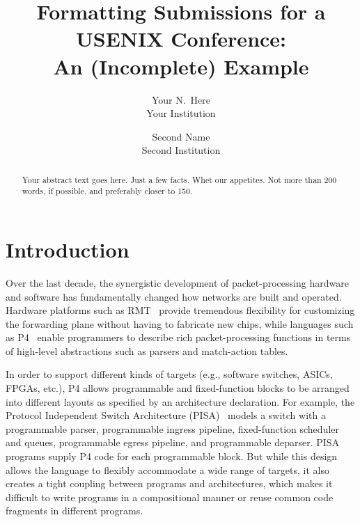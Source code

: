 \date{}

\title{\Large \bf Formatting Submissions for a USENIX Conference:\\
  An (Incomplete) Example}

\author{
{\rm Your N.\ Here}\\
Your Institution
\and
{\rm Second Name}\\
Second Institution
} %

\maketitle

\begin{abstract}
Your abstract text goes here. Just a few facts. Whet our appetites.
Not more than 200 words, if possible, and preferably closer to 150.
\end{abstract}


\section{Introduction}

Over the last decade, the synergistic development of packet-processing
hardware and software has fundamentally changed how networks are built
and operated. Hardware platforms such as
RMT~\cite{Bosshart:2013:FMF:2486001.2486011} provide tremendous
flexibility for customizing the forwarding plane without having to
fabricate new chips, while languages such as
P4~\cite{Bosshart:2014:PPP:2656877.2656890, p4lang} enable programmers
to describe rich packet-processing functions in terms of high-level
abstractions such as parsers and match-action tables.

In order to support different kinds of targets (e.g., software
switches, ASICs, FPGAs, etc.), P4 allows programmable and
fixed-function blocks to be arranged into different layouts as
specified by an architecture declaration. For example, the Protocol
Independent Switch Architecture
(PISA)~\cite{Bosshart:2013:FMF:2486001.2486011} models a switch with a
programmable parser, programmable ingress pipeline, fixed-function
scheduler and queues, programmable egress pipeline, and programmable
deparser. PISA programs supply P4 code for each programmable block.
But while this design allows the language to flexibly accommodate a
wide range of targets, it also creates a tight coupling between
programs and architectures, which makes it difficult to write programs
in a compositional manner or reuse common code fragments in different
programs.

